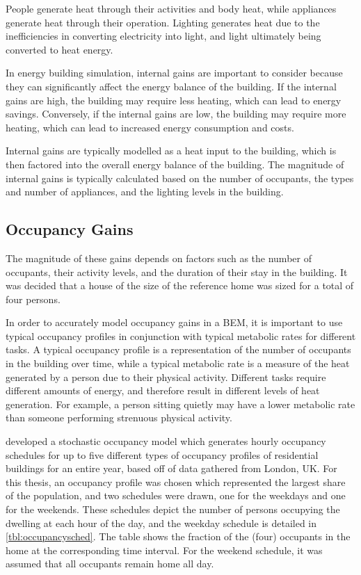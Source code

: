 People generate heat through their activities and body heat, while appliances generate heat through their operation. Lighting generates heat due to the inefficiencies in converting electricity into light, and light ultimately being converted to heat energy.

In energy building simulation, internal gains are important to consider because they can significantly affect the energy balance of the building. If the internal gains are high, the building may require less heating, which can lead to energy savings. Conversely, if the internal gains are low, the building may require more heating, which can lead to increased energy consumption and costs. \cite{buttitta_high-temporal_2020}

Internal gains are typically modelled as a heat input to the building, which is then factored into the overall energy balance of the building. The magnitude of internal gains is typically calculated based on the number of occupants, the types and number of appliances, and the lighting levels in the building.

\subsection{Occupancy Gains}
The magnitude of these gains depends on factors such as the number of occupants, their activity levels, and the duration of their stay in the building. It was decided that a house of the size of the reference home was sized for a total of four persons. 

In order to accurately model occupancy gains in a \ac{BEM}, it is important to use typical occupancy profiles in conjunction with typical metabolic rates for different tasks. A typical occupancy profile is a representation of the number of occupants in the building over time, while a typical metabolic rate is a measure of the heat generated by a person due to their physical activity. Different tasks require different amounts of energy, and therefore result in different levels of heat generation. For example, a person sitting quietly may have a lower metabolic rate than someone performing strenuous physical activity.

\citeauthor{buttitta_high-temporal_2020} \cite{buttitta_high-temporal_2020} developed a stochastic occupancy model which generates hourly occupancy schedules for up to five different types of occupancy profiles of residential buildings for an entire year, based off of data gathered from London, UK. For this thesis, an occupancy profile was chosen which represented the largest share of the population, and two schedules were drawn, one for the weekdays and one for the weekends. These schedules depict the number of persons occupying the dwelling at each hour of the day, and the weekday schedule is detailed in \cref{tbl:occupancysched}. The table shows the fraction of the (four) occupants in the home at the corresponding time interval. For the weekend schedule, it was assumed that all occupants remain home all day.

